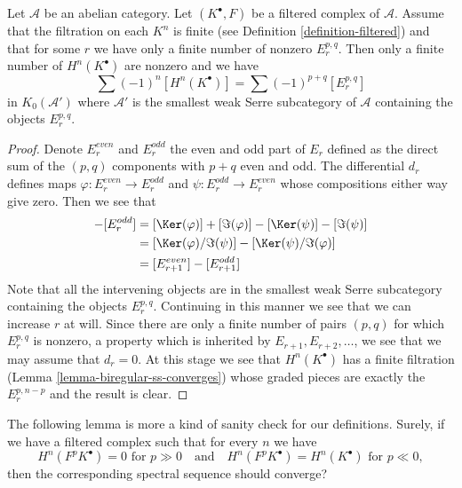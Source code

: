 \begin{lemma}
\label{lemma-biregular-ss-relation-in-K0}
Let $\mathcal{A}$ be an abelian category. Let $(K^\bullet, F)$ be a
filtered complex of $\mathcal{A}$. Assume that the filtration on each $K^n$
is finite (see Definition \ref{definition-filtered}) and that for some
$r$ we have only a finite number of nonzero $E_r^{p, q}$. Then
only a finite number of $H^n(K^\bullet)$ are nonzero and we have
$$
\sum (-1)^n[H^n(K^\bullet)] = \sum (-1)^{p + q} [E_r^{p, q}]
$$
in $K_0(\mathcal{A}')$ where $\mathcal{A}'$ is the smallest weak
Serre subcategory of $\mathcal{A}$ containing the objects
$E_r^{p, q}$.
\end{lemma}

\begin{proof}
Denote $E_r^{even}$ and $E_r^{odd}$ the even and odd part of $E_r$
defined as the direct sum of the $(p, q)$ components with $p + q$ even
and odd. The differential $d_r$ defines maps
$\varphi : E_r^{even} \to E_r^{odd}$ and $\psi : E_r^{odd} \to E_r^{even}$
whose compositions either way give zero.
Then we see that
\begin{align*}
[E_r^{even}] - [E_r^{odd}] & =
[\Ker(\varphi)] + [\Im(\varphi)] - [\Ker(\psi)] - [\Im(\psi)] \\
& =
[\Ker(\varphi)/\Im(\psi)] - [\Ker(\psi)/\Im(\varphi)] \\
& =
[E_{r + 1}^{even}] - [E_{r + 1}^{odd}]
\end{align*}
Note that all the intervening objects are in the smallest weak Serre
subcategory containing the objects $E_r^{p, q}$.
Continuing in this manner we see that we can increase $r$ at will.
Since there are only a finite number of pairs $(p, q)$ for which
$E_r^{p, q}$ is nonzero, a property which is inherited by
$E_{r + 1}, E_{r + 2}, \ldots$, we see that we may assume that $d_r = 0$.
At this stage we see that $H^n(K^\bullet)$ has a finite filtration
(Lemma \ref{lemma-biregular-ss-converges}) whose graded pieces
are exactly the $E_r^{p, n - p}$ and the result is clear.
\end{proof}

\noindent
The following lemma is more a kind of sanity check for our definitions.
Surely, if we have a filtered complex such that for every $n$ we have
$$
H^n(F^pK^\bullet) = 0\text{ for }p \gg 0
\quad\text{and}\quad
H^n(F^pK^\bullet) = H^n(K^\bullet)\text{ for }p \ll 0,
$$
then the corresponding spectral sequence should converge?

